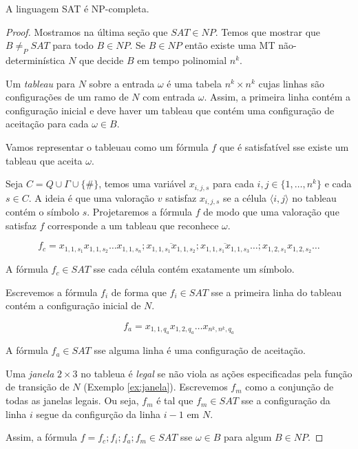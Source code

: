 \begin{theorem}
A linguagem SAT é NP-completa.
\end{theorem}
\begin{proof}
  Mostramos na última seção que $SAT \in NP$.
  Temos que mostrar que $B \neq_P SAT$ para todo $B \in NP$.
  Se $B \in NP$ então existe uma MT não-determinística $N$ que decide $B$ em tempo polinomial $n^k$.

  Um {\em tableau} para $N$ sobre a entrada $\omega$ é uma tabela $n^k \times n^k$ cujas linhas são configurações de um ramo de $N$ com entrada $\omega$.
  Assim, a primeira linha contém a configuração inicial e deve haver um tableau que contém uma configuração de aceitação para cada $\omega \in B$.


  Vamos representar o tableuau como um fórmula $f$ que é satisfatível sse existe um tableau que aceita $\omega$.

  Seja $C = Q \cup \Gamma \cup \{\#\}$, temos uma variável $x_{i,j,s}$ para cada $i,j \in \{1, \dots, n^k\}$ e cada $s \in C$.
  A ideia é que uma valoração $v$ satisfaz $x_{i,j,s}$ se a célula $\langle i, j \rangle$ no tableau contém o símbolo $s$.
  Projetaremos a fórmula $f$ de modo que uma valoração que satisfaz $f$ corresponde a um tableau que reconhece $\omega$.

  \begin{displaymath}
    f_c = x_{1,1,s_1}x_{1,1,s_2} \dots x_{1,1,s_n}; \overline{x_{1,1,s_1}x_{1,1,s_2}}; \overline{x_{1,1,s_1}x_{1,1,s_3}} \dots; x_{1,2,s_1}x_{1,2,s_2} \dots
  \end{displaymath}

  A fórmula $f_c \in SAT$ sse cada célula contém exatamente um símbolo.

  Escrevemos a fórmula $f_i$ de forma que $f_i \in SAT$ sse a primeira linha do tableau contém a configuração inicial de $N$.

  \begin{displaymath}
    f_a = x_{1,1,q_a}x_{1,2,q_a} \dots x_{n^k,n^k, q_a}
  \end{displaymath}

  A fórmula $f_a \in SAT$ sse alguma linha é uma configuração de aceitação.

  Uma {\em janela} $2 \times 3$ no tableua é {\em legal} se não viola as ações especificadas pela função de transição de $N$ (Exemplo \ref{ex:janela}).
  Escrevemos $f_m$ como a conjunção de todas as janelas legais.
  Ou seja, $f_m$ é tal que $f_m \in SAT$ sse a configuração da linha $i$ segue da configurção da linha $i-1$ em $N$.

  Assim, a fórmula $f = f_c;f_i;f_a;f_m \in SAT$ sse $\omega \in B$ para algum $B \in NP$.
\end{proof}

